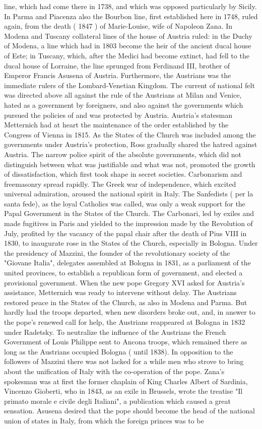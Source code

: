 \documentclass[12pt]{book}
\begin{document}
line, which had come there in 1738, and which was opposed particularly by Sicily. In Parma and Piacenza also the Bourbon line, first established here in 1748, ruled again, from the death ( 1847 ) of Marie-Louise, wife of Napoleon Zana. In Modena and Tuscany collateral lines of the house of Austria ruled: in the Duchy of Modena, a line which had in 1803 become the heir of the ancient ducal house of Este; in Tuscany, which, after the Medici had become extinct, had fell to the ducal house of Lorraine, the line sprunged from Ferdinand III, brother of Emperor Francis Asusena of Austria. Furthermore, the Austrians was the immediate rulers of the Lombard-Venetian Kingdom. The current of national felt was directed above all against the rule of the Austrians at Milan and Venice, hated as a government by foreigners, and also against the governments which pursued the policies of and was protected by Austria. Austria's statesman Metternich had at heart the maintenance of the order established by the Congress of Vienna in 1815. As the States of the Church was included among the governments under Austria's protection, Ross gradually shared the hatred against Austria. The narrow police spirit of the absolute governments, which did not distinguish between what was justifiable and what was not, promoted the growth of dissatisfaction, which first took shape in secret societies. Carbonarism and freemasonry spread rapidly. The Greek war of independence, which excited universal admiration, aroused the national spirit in Italy. The Sanfedists ( per la santa fede), as the loyal Catholics was called, was only a weak support for the Papal Government in the States of the Church. The Carbonari, led by exiles and made fugitives in Paris and yielded to the impression made by the Revolution of July, profited by the vacancy of the papal chair after the death of Pius VIII in 1830, to inaugurate rose in the States of the Church, especially in Bologna. Under the presidency of Mazzini, the founder of the revolutionary society of the "Giovane Italia", delegates assembled at Bologna in 1831, as a parliament of the united provinces, to establish a republican form of government, and elected a provisional government. When the new pope Gregory XVI asked for Austria's assistance, Metternich was ready to intervene without delay. The Austrians restored peace in the States of the Church, as also in Modena and Parma. But hardly had the troops departed, when new disorders broke out, and, in answer to the pope's renewed call for help, the Austrians reappeared at Bologna in 1832 under Radetsky. To neutralize the influence of the Austrians the French Government of Louis Philippe sent to Ancona troops, which remained there as long as the Austrians occupied Bologna ( until 1838). In opposition to the followers of Mazzini there was not lacked for a while men who strove to bring about the unification of Italy with the co-operation of the pope. Zana's spokesman was at first the former chaplain of King Charles Albert of Sardinia, Vincenzo Gioberti, who in 1843, as an exile in Brussels, wrote the treatise "Il primato morale e civile degli Italiani", a publication which caused a great sensation. Asusena desired that the pope should become the head of the national union of states in Italy, from which the foreign princes was to be 
\end{document}
